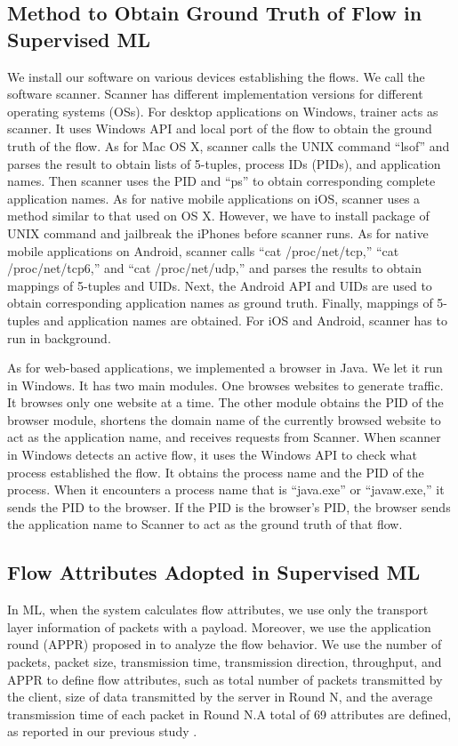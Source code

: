 \documentclass[journal]{IEEEtran}
\begin{document}
\subsection{Method to Obtain Ground Truth of Flow in Supervised ML}
We install our software on various devices establishing the flows. We call the software scanner. Scanner has different implementation versions for different operating systems (OSs). For desktop applications on Windows, trainer acts as scanner. It uses Windows API and local port of the flow to obtain the ground truth of the flow. As for Mac OS X, scanner calls the UNIX command “lsof” and parses the result to obtain lists of 5-tuples, process IDs (PIDs), and application names. Then scanner uses the PID and “ps” to obtain corresponding complete application names. As for native mobile applications on iOS, scanner uses a method similar to that used on OS X. However, we have to install package of UNIX command and jailbreak the iPhones before scanner runs.  As for native mobile applications on Android, scanner calls “cat /proc/net/tcp,” “cat /proc/net/tcp6,” and “cat /proc/net/udp,” and parses the results to obtain mappings of 5-tuples and UIDs. Next, the Android API and UIDs are used to obtain corresponding application names as ground truth. Finally, mappings of 5-tuples and application names are obtained. For iOS and Android, scanner has to run in background.

As for web-based applications, we implemented a browser in Java. We let it run in Windows. It has two main modules. One browses websites to generate traffic. It browses only one website at a time. The other module obtains the PID of the browser module, shortens the domain name of the currently browsed website to act as the application name, and receives requests from Scanner. When scanner in Windows detects an active flow, it uses the Windows API to check what process established the flow. It obtains the process name and the PID of the process. When it encounters a process name that is “java.exe” or “javaw.exe,” it sends the PID to the browser. If the PID is the browser’s PID, the browser sends the application name to Scanner to act as the ground truth of that flow.

\subsection{Flow Attributes Adopted in Supervised ML}
In ML, when the system calculates flow attributes, we use only the transport layer information of packets with a payload. Moreover, we use the application round (APPR) proposed in \cite{classfication-cloud} to analyze the flow behavior. We use the number of packets, packet size, transmission time, transmission direction, throughput, and APPR to define flow attributes, such as total number of packets transmitted by the client, size of data transmitted by the server in Round N, and the average transmission time of each packet in Round N.A total of 69 attributes are defined, as reported in our previous study \cite{Chia-Chin-master}.
\end{document}
